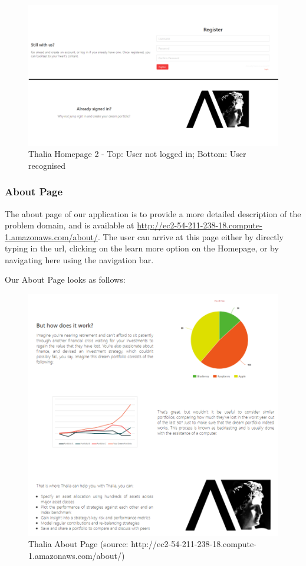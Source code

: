 \documentclass[main.tex]{subfiles}
\begin{document}
\begin{figure}[H]
   \centering
   \includegraphics[width=\textwidth]{08Appendices/081User/081Pictures/homepage_bottom.png}
   \caption{Thalia Homepage 2 - Top: User not logged in; Bottom: User recognised}
   \label{thalia_home_bottom}
\end{figure}

\subsubsection{About Page}

The about page of our application is to provide a more detailed description of the problem domain, and is available at \url{http://ec2-54-211-238-18.compute-1.amazonaws.com/about/}.
The user can arrive at this page either by directly typing in the url, clicking on the learn more option on the Homepage, or by navigating here using the navigation bar.

Our About Page looks as follows:

\begin{figure}[H]
   \centering
   \includegraphics[width=\textwidth]{08Appendices/081User/081Pictures/about.png}
   \caption{Thalia About Page (source: http://ec2-54-211-238-18.compute-1.amazonaws.com/about/)}
   \label{thalia_about}
\end{figure}
\end{document}
